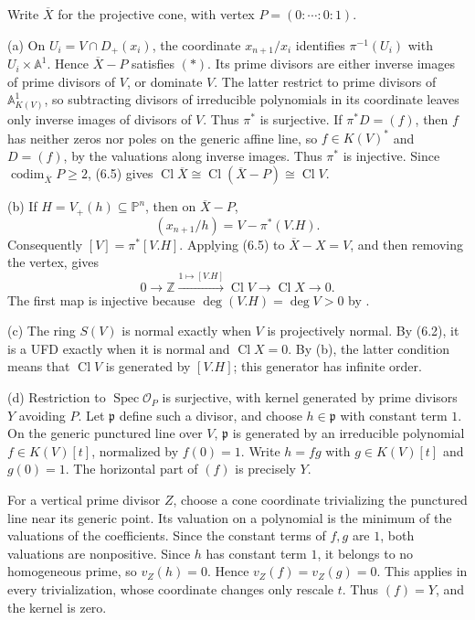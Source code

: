 Write $\overline X$ for the projective cone, with vertex $P=(0:\cdots:0:1)$.

(a) On $U_i=V\cap D_+(x_i)$, the coordinate $x_{n+1}/x_i$ identifies $\pi^{-1}(U_i)$ with $U_i\times\mathbb A^1$. Hence $\overline X-P$ satisfies $(*)$. Its prime divisors are either inverse images of prime divisors of $V$, or dominate $V$. The latter restrict to prime divisors of $\mathbb A^1_{K(V)}$, so subtracting divisors of irreducible polynomials in its coordinate leaves only inverse images of divisors of $V$. Thus $\pi^*$ is surjective. If $\pi^*D=(f)$, then $f$ has neither zeros nor poles on the generic affine line, so $f\in K(V)^*$ and $D=(f)$, by the valuations along inverse images. Thus $\pi^*$ is injective. Since $\operatorname{codim}_{\overline X}P\geq2$, (6.5) gives $\operatorname{Cl}\overline X\cong\operatorname{Cl}(\overline X-P)\cong\operatorname{Cl}V$.

(b) If $H=V_+(h)\subseteq\mathbb P^n$, then on $\overline X-P$,
\[(x_{n+1}/h)=V-\pi^*(V.H).\]
Consequently $[V]=\pi^*[V.H]$. Applying (6.5) to $\overline X-X=V$, and then removing the vertex, gives
\[0\to\mathbb Z\xrightarrow{1\mapsto[V.H]}\operatorname{Cl}V\to\operatorname{Cl}X\to0.\]
The first map is injective because $\deg(V.H)=\deg V>0$ by .

(c) The ring $S(V)$ is normal exactly when $V$ is projectively normal. By (6.2), it is a UFD exactly when it is normal and $\operatorname{Cl}X=0$. By (b), the latter condition means that $\operatorname{Cl}V$ is generated by $[V.H]$; this generator has infinite order.

(d) Restriction to $\operatorname{Spec}\mathcal O_P$ is surjective, with kernel generated by prime divisors $Y$ avoiding $P$. Let $\mathfrak p$ define such a divisor, and choose $h\in\mathfrak p$ with constant term $1$. On the generic punctured line over $V$, $\mathfrak p$ is generated by an irreducible polynomial $f\in K(V)[t]$, normalized by $f(0)=1$. Write $h=fg$ with $g\in K(V)[t]$ and $g(0)=1$. The horizontal part of $(f)$ is precisely $Y$.

For a vertical prime divisor $Z$, choose a cone coordinate trivializing the punctured line near its generic point. Its valuation on a polynomial is the minimum of the valuations of the coefficients. Since the constant terms of $f,g$ are $1$, both valuations are nonpositive. Since $h$ has constant term $1$, it belongs to no homogeneous prime, so $v_Z(h)=0$. Hence $v_Z(f)=v_Z(g)=0$. This applies in every trivialization, whose coordinate changes only rescale $t$. Thus $(f)=Y$, and the kernel is zero.
